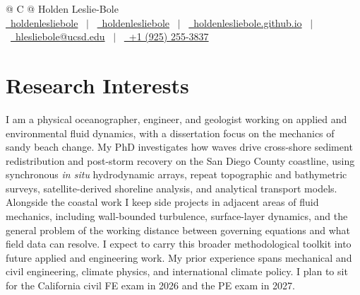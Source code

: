 \documentclass[a4paper,10pt]{article}
\begin{document}
\pagestyle{empty} 



\begin{tabularx}{\linewidth}{@{} C @{}}
\Huge{Holden Leslie-Bole} \\[7.5pt]
\href{https://github.com/holdenlesliebole}{\raisebox{-0.05\height}\faGithub\ holdenlesliebole} \ $|$ \
\href{https://www.linkedin.com/in/holdenlesliebole/}{\raisebox{-0.05\height}\faLinkedin\ holdenlesliebole} \ $|$ \
\href{https://holdenlesliebole.github.io}{\raisebox{-0.05\height}\faGlobe \ holdenlesliebole.github.io} \ $|$ \
\href{mailto:hlesliebole@ucsd.edu}{\raisebox{-0.05\height}\faEnvelope \ hlesliebole@ucsd.edu} \ $|$ \
\href{tel:+19252553837}{\raisebox{-0.05\height}\faMobile \ +1 (925) 255-3837} \\
\end{tabularx}


\section{Research Interests}
I am a physical oceanographer, engineer, and geologist working on applied and environmental fluid dynamics, with a dissertation focus on the mechanics of sandy beach change. My PhD investigates how waves drive cross-shore sediment redistribution and post-storm recovery on the San Diego County coastline, using synchronous \emph{in situ} hydrodynamic arrays, repeat topographic and bathymetric surveys, satellite-derived shoreline analysis, and analytical transport models. Alongside the coastal work I keep side projects in adjacent areas of fluid mechanics, including wall-bounded turbulence, surface-layer dynamics, and the general problem of the working distance between governing equations and what field data can resolve. I expect to carry this broader methodological toolkit into future applied and engineering work. My prior experience spans mechanical and civil engineering, climate physics, and international climate policy. I plan to sit for the California civil FE exam in 2026 and the PE exam in 2027.
\end{document}
